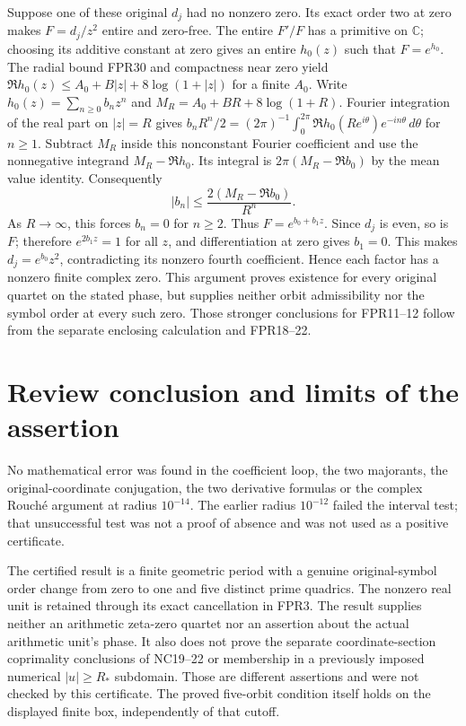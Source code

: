 \documentclass[11pt]{article}
\newcommand{\C}{\mathbb C}
\begin{document}
Suppose one of these original $d_j$ had no nonzero zero.
Its exact order two at zero makes $F=d_j/z^2$ entire and
zero-free. The entire $F'/F$ has a primitive on $\C$;
choosing its additive constant at zero gives an entire $h_0(z)$
such that $F=e^{h_0}$. The radial bound FPR30 and compactness
near zero yield
$\Re h_0(z)\le A_0+B|z|+8\log(1+|z|)$ for a finite $A_0$.
Write $h_0(z)=\sum_{n\ge0}b_nz^n$ and
$M_R=A_0+BR+8\log(1+R)$.
Fourier integration of the real part on $|z|=R$ gives
$b_nR^n/2=(2\pi)^{-1}\int_0^{2\pi}
\Re h_0(Re^{i\theta})e^{-in\theta}\,d\theta$ for $n\ge1$.
Subtract $M_R$ inside this nonconstant Fourier coefficient and
use the nonnegative integrand $M_R-\Re h_0$. Its integral is
$2\pi(M_R-\Re b_0)$ by the mean value identity. Consequently
\[
 |b_n|\le\frac{2(M_R-\Re b_0)}{R^n}.
 \tag{FPR32}
\]
As $R\to\infty$, this forces $b_n=0$ for $n\ge2$.
Thus $F=e^{b_0+b_1z}$. Since $d_j$ is even, so is $F$;
therefore $e^{2b_1z}=1$ for all $z$, and differentiation at
zero gives $b_1=0$. This makes $d_j=e^{b_0}z^2$, contradicting
its nonzero fourth coefficient. Hence each factor has a
nonzero finite complex zero. This argument proves existence
for every original quartet on the stated phase, but supplies
neither orbit admissibility nor the symbol order at every such
zero. Those stronger conclusions for FPR11--12 follow from
the separate enclosing calculation and FPR18--22.

\section{Review conclusion and limits of the assertion}
No mathematical error was found in the coefficient loop, the
two majorants, the original-coordinate conjugation, the two
derivative formulas or the complex Rouch\'e argument at radius
$10^{-14}$. The earlier radius $10^{-12}$ failed the interval
test; that unsuccessful test was not a proof of absence and
was not used as a positive certificate.

The certified result is a finite geometric period with a genuine
original-symbol order change from zero to one and five distinct
prime quadrics. The nonzero real unit is retained through its
exact cancellation in FPR3. The result supplies neither an
arithmetic zeta-zero quartet nor an assertion about the actual
arithmetic unit's phase. It also does not prove the separate
coordinate-section coprimality conclusions of NC19--22 or
membership in a previously imposed numerical $|u|\ge R_*$
subdomain. Those are different assertions and were not checked
by this certificate. The proved five-orbit condition itself
holds on the displayed finite box, independently of that cutoff.
\end{document}
